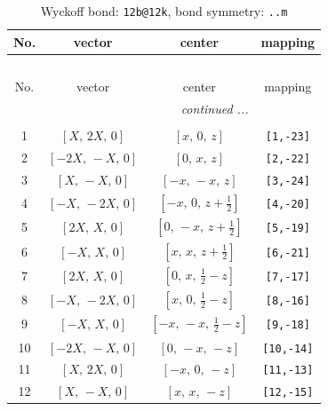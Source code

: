 \documentclass[fleqn,8pt]{jsarticle}
\begin{document}
\begin{longtable}{cccc}
\caption{Wyckoff bond: {\tt 12b@12k}, bond symmetry: {\tt ..m}}
 \\
 \hline \hline
No. & vector & center & mapping \\ \hline \endfirsthead

\multicolumn{3}{l}{\tablename\ \thetable{}} \\
 \hline \hline
No. & vector & center & mapping \\ \hline \endhead

 \hline \hline
\multicolumn{3}{r}{\footnotesize\it continued ...} \\ \endfoot

 \hline \hline
\multicolumn{3}{r}{} \\ \endlastfoot

1 & $\left[ X,\, 2 X,\, 0 \right]$ & $\left[ x,\, 0,\, z \right]$ & {\tt [1,-23]} \\ \hline
2 & $\left[ - 2 X,\, - X,\, 0 \right]$ & $\left[ 0,\, x,\, z \right]$ & {\tt [2,-22]} \\ \hline
3 & $\left[ X,\, - X,\, 0 \right]$ & $\left[ - x,\, - x,\, z \right]$ & {\tt [3,-24]} \\ \hline
4 & $\left[ - X,\, - 2 X,\, 0 \right]$ & $\left[ - x,\, 0,\, z + \frac{1}{2} \right]$ & {\tt [4,-20]} \\ \hline
5 & $\left[ 2 X,\, X,\, 0 \right]$ & $\left[ 0,\, - x,\, z + \frac{1}{2} \right]$ & {\tt [5,-19]} \\ \hline
6 & $\left[ - X,\, X,\, 0 \right]$ & $\left[ x,\, x,\, z + \frac{1}{2} \right]$ & {\tt [6,-21]} \\ \hline
7 & $\left[ 2 X,\, X,\, 0 \right]$ & $\left[ 0,\, x,\, \frac{1}{2} - z \right]$ & {\tt [7,-17]} \\ \hline
8 & $\left[ - X,\, - 2 X,\, 0 \right]$ & $\left[ x,\, 0,\, \frac{1}{2} - z \right]$ & {\tt [8,-16]} \\ \hline
9 & $\left[ - X,\, X,\, 0 \right]$ & $\left[ - x,\, - x,\, \frac{1}{2} - z \right]$ & {\tt [9,-18]} \\ \hline
10 & $\left[ - 2 X,\, - X,\, 0 \right]$ & $\left[ 0,\, - x,\, - z \right]$ & {\tt [10,-14]} \\ \hline
11 & $\left[ X,\, 2 X,\, 0 \right]$ & $\left[ - x,\, 0,\, - z \right]$ & {\tt [11,-13]} \\ \hline
12 & $\left[ X,\, - X,\, 0 \right]$ & $\left[ x,\, x,\, - z \right]$ & {\tt [12,-15]} \\
\end{longtable}
\end{document}
